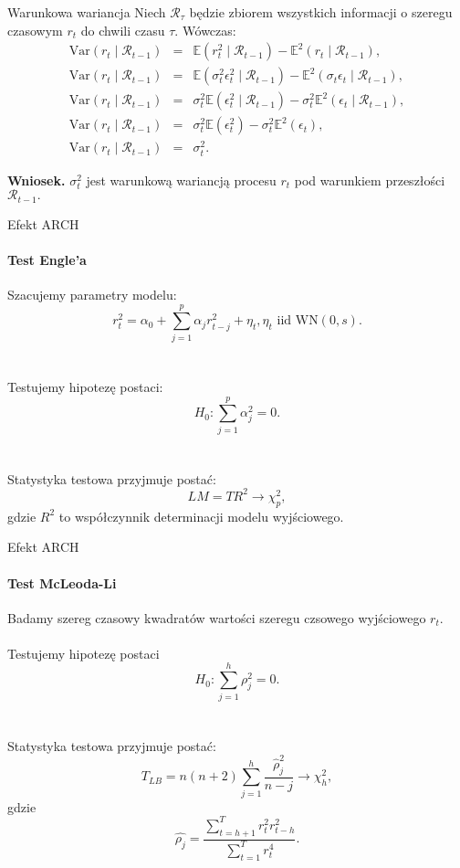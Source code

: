 \documentclass[a4paper, 11pt]{beamer}
\begin{document}
	\begin{frame}{Warunkowa wariancja}
		Niech $\boldsymbol{\mathcal{R}}_{\tau}$ będzie zbiorem wszystkich informacji o szeregu
		czasowym $r_t$ do chwili czasu $\tau.$ Wówczas: \begin{eqnarray*}
			\mbox{Var}\left( r_t \mid \boldsymbol{\mathcal{R}}_{t-1} \right) & = &
				\mathbb{E}\left( r_t^2 \mid \boldsymbol{\mathcal{R}}_{t-1} \right) -
				\mathbb{E}^2\left( r_t \mid \boldsymbol{\mathcal{R}}_{t-1} \right),\\
			\mbox{Var}\left( r_t \mid \boldsymbol{\mathcal{R}}_{t-1} \right) & = &
				\mathbb{E}\left( \sigma_t^2 \epsilon_t^2 \mid \boldsymbol{\mathcal{R}}_{t-1} \right) -
				\mathbb{E}^2\left( \sigma_t \epsilon_t \mid \boldsymbol{\mathcal{R}}_{t-1} \right),\\
			\mbox{Var}\left( r_t \mid \boldsymbol{\mathcal{R}}_{t-1} \right) & = &
				\sigma_t^2 \mathbb{E}\left( \epsilon_t^2 \mid \boldsymbol{\mathcal{R}}_{t-1} \right) -
				\sigma_t^2 \mathbb{E}^2\left( \epsilon_t \mid \boldsymbol{\mathcal{R}}_{t-1} \right),\\
			\mbox{Var}\left( r_t \mid \boldsymbol{\mathcal{R}}_{t-1} \right) & = &
				\sigma_t^2 \mathbb{E}\left( \epsilon_t^2 \right) -
				\sigma_t^2 \mathbb{E}^2\left( \epsilon_t \right),\\
			\mbox{Var}\left( r_t \mid \boldsymbol{\mathcal{R}}_{t-1} \right) & = &
				\sigma_t^2.
		\end{eqnarray*}
		\begin{alert}{\textbf{Wniosek.}}
			$\sigma_t^2$ jest warunkową wariancją procesu $r_t$ pod warunkiem przeszłości
			$\boldsymbol{\mathcal{R}}_{t-1}.$
		\end{alert}
	\end{frame}
	
	\begin{frame}{Efekt ARCH}
		\framesubtitle{Test Engle'a}
		Szacujemy parametry modelu: \[
			r_t^2 = \alpha_0 + \sum_{j=1}^p \alpha_j r_{t-j}^2 + \eta_t, \eta_t \mbox{ iid } \mbox{WN}\left(0, s\right).
		\]
		\\~\\
		Testujemy hipotezę postaci: \[
			H_0: \sum_{j=1}^p \alpha_j^2 = 0.
		\]
		\\~\\
		Statystyka testowa przyjmuje postać: \[
			LM = T R^2 \rightarrow \chi^2_p,
		\] gdzie $R^2$ to współczynnik determinacji modelu wyjściowego.
	\end{frame}
	
	\begin{frame}{Efekt ARCH}
		\framesubtitle{Test McLeoda-Li}
		Badamy szereg czasowy kwadratów wartości szeregu czsowego wyjściowego $r_t.$
		\\~\\
		Testujemy hipotezę postaci \[
			H_{0}: \sum_{j=1}^{h} \rho^{2}_j = 0.
		\]
		\\~\\
		Statystyka testowa przyjmuje postać: \[
			T_{LB} = n \left(n + 2\right) \sum_{j=1}^{h}
				\frac{\hat{\rho}^{2}_j}{n - j} \rightarrow \chi^{2}_{h},
		\] gdzie \[
			\hat{\rho_j} = \frac{\sum_{t=h+1}^T r_t^2 r_{t-h}^2}{\sum_{t=1}^T r_t^4}.
		\]
	\end{frame}
	
\end{document}
